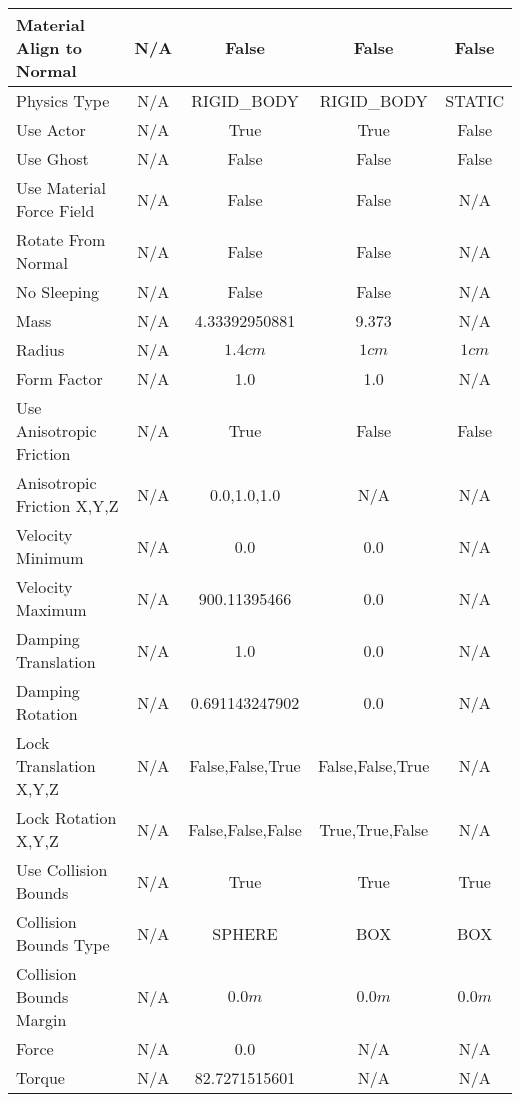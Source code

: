 \begin{table}[htbp]
\begin{tabular}{ | l || c | c | c | c | }
Material Align to Normal   & N/A & False                            & False & False \\ \hline \hline
Physics Type               & N/A & RIGID\_BODY & RIGID\_BODY  & STATIC \\ \hline
Use Actor                  & N/A & True  & True  & False \\ \hline
Use Ghost                  & N/A & False & False & False \\ \hline
Use Material Force Field   & N/A & False & False & N/A \\ \hline
Rotate From Normal         & N/A & False & False & N/A \\ \hline
No Sleeping                & N/A & False & False & N/A \\ \hline
Mass                       & N/A & \cellcolor{cyan} 4.33392950881  & 9.373 & N/A \\ \hline
Radius                     & N/A & $1.4cm$     & $1cm$ & $1cm$ \\ \hline
Form Factor                & N/A & 1.0         & 1.0   & N/A \\ \hline
Use Anisotropic Friction   & N/A & True        & False & False \\ \hline
Anisotropic Friction X,Y,Z & N/A & 0.0,1.0,1.0 & N/A   & N/A \\ \hline
Velocity Minimum           & N/A & 0.0                             & 0.0 & N/A \\ \hline
Velocity Maximum           & N/A & \cellcolor{cyan} 900.11395466   & 0.0 & N/A \\ \hline
Damping Translation        & N/A & \cellcolor{cyan} 1.0            & 0.0 & N/A \\ \hline
Damping Rotation           & N/A & \cellcolor{cyan} 0.691143247902 & 0.0 & N/A \\ \hline
Lock Translation X,Y,Z     & N/A & False,False,True  & False,False,True  & N/A \\ \hline
Lock Rotation X,Y,Z        & N/A & False,False,False & True,True,False   & N/A \\ \hline
Use Collision Bounds       & N/A & True & True & True \\ \hline
Collision Bounds Type      & N/A & \cellcolor{cyan} SPHERE & BOX & BOX \\ \hline
Collision Bounds Margin    & N/A & $0.0m$ & $0.0m$ & $0.0m$ \\ \hline \hline
Force                      & N/A & 0.0    & N/A    & N/A \\ \hline
Torque                     & N/A & \cellcolor{cyan} 82.7271515601 & N/A & N/A \\ \hline

\end{tabular}
\end{table}
